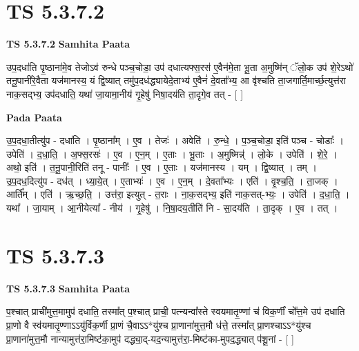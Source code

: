 \documentclass[17pt]{extarticle}
\begin{document}

\section{ TS 5.3.7.2 }

\textbf{TS 5.3.7.2 } \newline
\textbf{Samhita Paata} \newline

उप॒दधा॑ति पृ॒ष्ठाना॑मे॒व तेजोऽव॑ रुन्धे पञ्च॒चोडा॒ उप॑ दधात्यफ्स॒रस॑ ए॒वैन॑मे॒ता भू॒ता अ॒मुष्मि॑न् ॅलो॒क उप॑ शे॒रेऽथो॑ तनू॒पानी॑रे॒वैता यज॑मानस्य॒ यं द्वि॒ष्यात् तमु॑प॒दध॑द्ध्यायेदे॒ताभ्य॑ ए॒वैनं॑ दे॒वता᳚भ्य॒ आ वृ॑श्चति ता॒जगार्ति॒मार्च्छ॒त्युत्त॑रा नाक॒सद्भ्य॒ उप॑दधाति॒ यथा॑ जा॒यामा॒नीय॑ गृ॒हेषु॑ निषा॒दय॑ति ता॒दृगे॒व तत् - [  ] \newline

\textbf{Pada Paata} \newline

उ॒प॒दधा॒तीत्यु॑प - दधा॑ति । पृ॒ष्ठाना᳚म् । ए॒व । तेजः॑ । अवेति॑ । रु॒न्धे॒ । प॒ञ्च॒चोडा॒ इति॑ पञ्च - चोडाः᳚ । उपेति॑ । द॒धा॒ति॒ । अ॒फ्स॒रसः॑ । ए॒व । ए॒न॒म् । ए॒ताः । भू॒ताः । अ॒मुष्मिन्न्॑ । लो॒के । उपेति॑ । शे॒रे॒ । अथो॒ इति॑ । त॒नू॒पानी॒रिति॑ तनू - पानीः᳚ । ए॒व । ए॒ताः । यज॑मानस्य । यम् । द्वि॒ष्यात् । तम् । उ॒प॒दध॒दित्यु॑प - दध॑त् । ध्या॒ये॒त् । ए॒ताभ्यः॑ । ए॒व । ए॒न॒म् । दे॒वता᳚भ्यः । एति॑ । वृ॒श्च॒ति॒ । ता॒जक् । आर्ति᳚म् । एति॑ । ऋ॒च्छ॒ति॒ । उत्त॑रा॒ इत्युत् - त॒राः । ना॒क॒सद्भ्य॒ इति॑ नाक॒सत्-भ्यः॒ । उपेति॑ । द॒धा॒ति॒ । यथा᳚ । जा॒याम् । आ॒नीयेत्या᳚ - नीय॑ । गृ॒हेषु॑ । नि॒षा॒दय॒तीति॑ नि - सा॒दय॑ति । ता॒दृक् । ए॒व । तत् ।  \newline





\section{ TS 5.3.7.3 }

\textbf{TS 5.3.7.3 } \newline
\textbf{Samhita Paata} \newline

प॒श्चात् प्राची॑मुत्त॒मामुप॑ दधाति॒ तस्मा᳚त् प॒श्चात् प्राची॒ पत्न्यन्वा᳚स्ते स्वयमातृ॒ण्णां च॑ विक॒र्णीं चो᳚त्त॒मे उप॑ दधाति प्रा॒णो वै स्व॑यमातृ॒ण्णाऽऽयु॑र्विक॒र्णी प्रा॒णं चै॒वाऽऽ*यु॑श्च प्रा॒णाना॑मुत्त॒मौ ध॑त्ते॒ तस्मा᳚त् प्रा॒णश्चाऽऽ*यु॑श्च प्रा॒णाना॑मुत्त॒मौ नान्यामुत्त॑रा॒मिष्ट॑का॒मुप॑ दद्ध्या॒द्-यद॒न्यामुत्त॑रा॒-मिष्ट॑का-मुपद॒द्ध्यात् प॑शू॒नां - [  ] \newline
\end{document}
